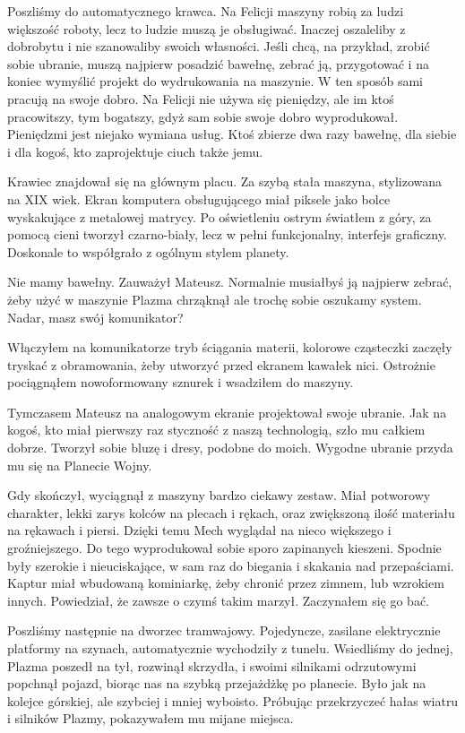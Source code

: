 Poszliśmy do automatycznego krawca.
Na Felicji maszyny robią za ludzi większość roboty, lecz to ludzie muszą je obsługiwać. 
Inaczej oszaleliby z dobrobytu i nie szanowaliby swoich własności.
Jeśli chcą, na przykład, zrobić sobie ubranie, muszą najpierw posadzić bawełnę, zebrać ją, przygotować i na koniec wymyślić projekt do wydrukowania na maszynie.
W ten sposób sami pracują na swoje dobro.
Na Felicji nie używa się pieniędzy, ale im ktoś pracowitszy, tym bogatszy, gdyż sam sobie swoje dobro wyprodukował.
Pieniędzmi jest niejako wymiana usług. Ktoś zbierze dwa razy bawełnę, dla siebie i dla kogoś, kto zaprojektuje ciuch także jemu.

Krawiec znajdował się na głównym placu.
Za szybą stała maszyna, stylizowana na XIX wiek. 
Ekran komputera obsługującego miał piksele jako bolce wyskakujące z metalowej matrycy. 
Po oświetleniu ostrym światłem z góry, za pomocą cieni tworzył czarno-biały, lecz w pełni funkcjonalny, interfejs graficzny.
Doskonale to współgrało z ogólnym stylem planety.

\begin{dialogue}
\ds{} Nie mamy bawełny. \dm{} Zauważył Mateusz.
\ds{} Normalnie musiałbyś ją najpierw zebrać, żeby użyć w maszynie \dm{} Plazma chrząknął \dm{} ale trochę sobie oszukamy system.
Nadar, masz swój komunikator?
\end{dialogue}

Włączyłem na komunikatorze tryb ściągania materii, kolorowe cząsteczki zaczęły tryskać z obramowania, żeby utworzyć przed ekranem kawałek nici.
Ostrożnie pociągnąłem nowoformowany sznurek i wsadziłem do maszyny. 

Tymczasem Mateusz na analogowym ekranie projektował swoje ubranie. 
Jak na kogoś, kto miał pierwszy raz styczność z naszą technologią, szło mu całkiem dobrze.
Tworzył sobie bluzę i dresy, podobne do moich. Wygodne ubranie przyda mu się na Planecie Wojny.

Gdy skończył, wyciągnął z maszyny bardzo ciekawy zestaw. Miał potworowy charakter, lekki zarys kolców na plecach i rękach, oraz zwiększoną ilość materiału na rękawach i piersi.
Dzięki temu Mech wyglądał na nieco większego i groźniejszego.
Do tego wyprodukował sobie sporo zapinanych kieszeni. 
Spodnie były szerokie i nieuciskające, w sam raz do biegania i skakania nad przepaściami.
Kaptur miał wbudowaną kominiarkę, żeby chronić przez zimnem, lub wzrokiem innych.
Powiedział, że zawsze o czymś takim marzył.
Zaczynałem się go bać.

Poszliśmy następnie na dworzec tramwajowy. Pojedyncze, zasilane elektrycznie platformy na szynach, automatycznie wychodziły z tunelu.
Wsiedliśmy do jednej, Plazma poszedł na tył, rozwinął skrzydła, i swoimi silnikami odrzutowymi popchnął pojazd, biorąc nas na szybką przejażdżkę po planecie.
Było jak na kolejce górskiej, ale szybciej i mniej wyboisto.
Próbując przekrzyczeć hałas wiatru i silników Plazmy, pokazywałem mu mijane miejsca.

